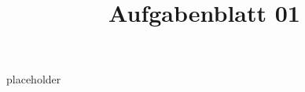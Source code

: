 \documentclass{article}
\title{Aufgabenblatt 01}
\begin{document}
\maketitle
placeholder
\end{document}
